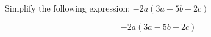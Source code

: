 \question Simplify the following expression: 
$-2a(3a - 5b + 2c)$
\begin{solution}
	\[
		-2a(3a - 5b + 2c)
	\]
\end{solution}

